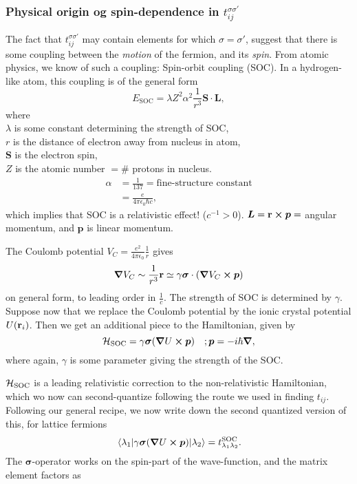 \subsubsection*{Physical origin og spin-dependence in $t_{ij}^{\sigma\sigma'}$}
The fact that $t_{ij}^{\sigma\sigma'}$ may contain elements for which $\sigma=\sigma'$, suggest that there is some coupling between the \emph{motion} of the fermion, and its \emph{spin}. 
From atomic physics, we know of such a coupling: Spin-orbit coupling (SOC).
In a hydrogen-like atom, this coupling is of the general form 
\begin{equation}
	E_{\text{SOC}} = \lambda Z^2\alpha^2\frac{1}{r^3} \bm{S}\cdot \bm{L},
\end{equation}
where\\
$\lambda$ is some constant determining the strength of SOC,\\
$r$ is the distance of electron away from nucleus in atom,\\
$\bm{S}$ is the electron spin, \\
$Z$ is the atomic number $=\#$ protons in nucleus.
\begin{align*}
	\alpha &= \frac{1}{137} =  \text{fine-structure constant} \\
	&= \frac{e}{4\pi\epsilon_0\hbar c},
\end{align*}
which implies that SOC is a relativistic effect! ($c^{-1}>0$).
$\bm{L} = \vb{r}\cross\bm{p} = $ angular momentum, and $\bm{p}$ is linear momentum.

The Coulomb potential $V_{C} = \frac{e^2}{4\pi\epsilon_0}\frac{1}{r}$ gives
\begin{equation}
	\grad{V_{C}} \sim \frac{1}{r^3}\vb{r} \simeq \gamma \bm{\sigma}\cdot (\grad{V_{C}}\cross \bm{p})
\end{equation}
on general form, to leading order in $\frac{1}{c}$. The strength of SOC is determined by $\gamma$.
Suppose now that we replace the Coulomb potential by the ionic crystal potential $U(\vb{r}_i)$. Then we get an additional piece to the Hamiltonian, given by
\begin{equation}
	\mathcal{H}_{\text{SOC}} = \gamma \bm{\sigma}(\grad{U}\cross \bm{p}) \quad ; \bm{p} = -i\hbar\grad,
\end{equation}
where again, $\gamma$ is some parameter giving the strength of the SOC.

$\mathcal{H}_{\text{SOC}}$ is a leading relativistic correction to the non-relativistic Hamiltonian, which wo now can second-quantize following the route we used in finding $t_{ij}$. 
Following our general recipe, we now write down the second quantized version of this, for lattice fermions
\begin{equation}
	\mel{\lambda_{1}}{\gamma \bm{\sigma}(\grad{U}\cross \bm{p})}{\lambda_2} = t_{\lambda_1\lambda_2}^{\text{SOC}}.
\end{equation}
The $\bm{\sigma}$-operator works on the spin-part of the wave-function, and the matrix element factors as

